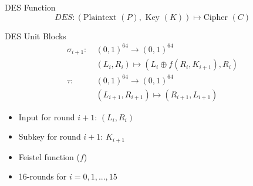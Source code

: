\documentclass[9pt]{beamer}
\begin{document}
\begin{frame}
\begin{columns}
\begin{column}{0.6\textwidth}
\begin{block}{DES Function}
\[ DES : (\mbox{Plaintext }(P), \mbox{ Key }(K))  \mapsto \mbox{Cipher }(C) \]
\end{block}

\begin{block}{DES Unit Blocks}
\begin{align*}
\sigma_{i+1} : \: & (0,1)^{64} \rightarrow (0,1)^{64} \\
& (L_i, R_i) \mapsto (L_i \oplus f(R_i,K_{i+1}), R_i) \\
\tau : \: & (0,1)^{64} \rightarrow (0,1)^{64} \\
& (L_{i+1},R_{i+1}) \mapsto (R_{i+1},L_{i+1})
\end{align*}
\end{block}

\begin{itemize}
\item{Input for round $i+1$: $(L_i,R_i)$}
\item{Subkey for round $i+1$: $K_{i+1}$}
\item{Feistel function ($f$)}
\item{16-rounds for $i = 0, 1, ..., 15$}
\end{itemize}


\end{column}
\end{columns}
\end{frame}
\end{document}
